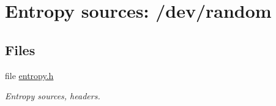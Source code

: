 \hypertarget{group__ES__random__m}{
\section{Entropy sources: /dev/random}
\label{group__ES__random__m}
}
\subsection*{Files}
\begin{CompactItemize}
\item 
file \hyperlink{entropy_8h}{entropy.h}
\begin{CompactList}\small\item\em Entropy sources, headers. \item\end{CompactList}

\end{CompactItemize}
